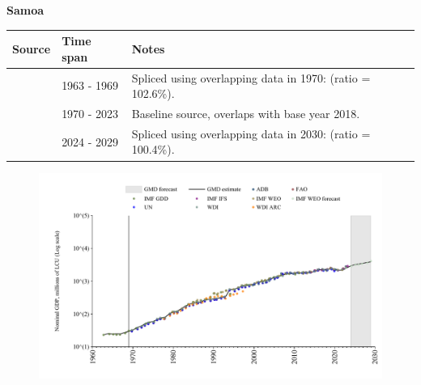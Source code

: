 \documentclass[12pt,a4paper,landscape]{article}
\begin{document}
\begin{adjustbox}{max totalsize={\paperwidth}{\paperheight},center}
\begin{minipage}[t][\textheight][t]{\textwidth}
\vspace*{0.5cm}
{}
\begin{center}
{\Large\bfseries Samoa}
\end{center}
\vspace{0.5cm}
\begin{table}[H]
\centering
\small
\begin{tabular}{|l|l|l|}
\hline
\textbf{Source} & \textbf{Time span} & \textbf{Notes} \\
\hline
\rowcolor{white}\cite{IMF_GDD}& 1963 - 1969 &Spliced using overlapping data in 1970: (ratio = 102.6\%).\\
\rowcolor{lightgray}\cite{WDI}& 1970 - 2023 &Baseline source, overlaps with base year 2018.\\
\rowcolor{white}\cite{IMF_WEO_forecast}& 2024 - 2029 &Spliced using overlapping data in 2030: (ratio = 100.4\%).\\
\hline
\end{tabular}
\end{table}
\begin{figure}[H]
\centering
\includegraphics[width=\textwidth,height=0.6\textheight,keepaspectratio]{graphs/WSM_nGDP.pdf}
\end{figure}
\end{minipage}
\end{adjustbox}
\end{document}
